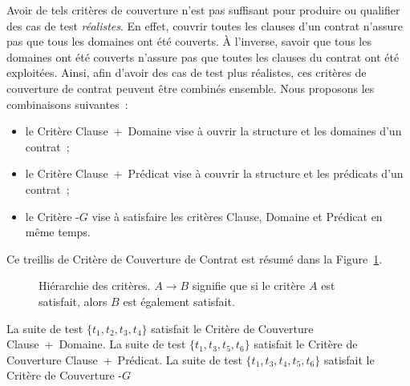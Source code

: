 Avoir de tels critères de couverture n'est pas suffisant pour produire ou
qualifier des cas de test {\em réalistes}. En effet, couvrir toutes les clauses
d'un contrat n'assure pas que tous les domaines ont été couverts. À l'inverse,
savoir que tous les domaines ont été couverts n'assure pas que toutes les
clauses du contrat ont été exploitées. Ainsi, afin d'avoir des cas de test plus
réalistes, ces critères de couverture de contrat peuvent être combinés ensemble.
Nous proposons les combinaisons suivantes~:
%
\begin{itemize}

\item le Critère Clause~+~Domaine vise à ouvrir la structure et les domaines
d'un contrat~;

\item le Critère Clause~+~Prédicat vise à couvrir la structure et les prédicats
d'un contrat~;

\item le Critère -$G$ vise à satisfaire les critères Clause,
Domaine et Prédicat en même temps.

\end{itemize}
%
Ce treillis de Critère de Couverture de Contrat est résumé dans la
Figure~\ref{figure:test:lattice}.

\begin{figure}


\caption{\label{figure:test:lattice} Hiérarchie des critères. $A \rightarrow B$
signifie que si le critère $A$ est satisfait, alors $B$ est également
satisfait.}

\end{figure}

\begin{example}

La suite de test $\{t_1, t_2, t_3, t_4\}$ satisfait le Critère de Couverture
Clause~+~Domaine. La suite de test $\{t_1, t_3, t_5, t_6\}$ satisfait le Critère
de Couverture Clause~+~Prédicat. La suite de test $\{t_1, t_3, t_4, t_5, t_6\}$
satisfait le Critère de Couverture -$G$

\end{example}
